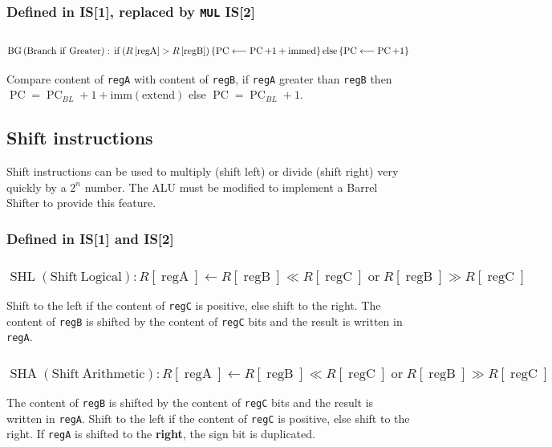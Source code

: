 \documentclass[10pt,a4paper]{article}
\theoremstyle{definition}%
\newcommand{\on}[1]{\operatorname{#1}}
\newcommand{\reg}[1]{\texttt{reg#1}}
\begin{document}
\subsubsection*{ Defined in IS[1], replaced by \texttt{MUL} IS[2]}

\subsubsection{$\on{BG} \on{(Branch~if~Greater)}:\newline \on{if} \left( R\left[ \on{regA} \right] > R\left[ \on{regB} \right]\right) \left\lbrace\on{PC} \longleftarrow \on{PC}+1+\on{immed} \right\rbrace\on{else} \left\lbrace\on{PC} \longleftarrow \on{PC}+1\right\rbrace $}
Compare content of \reg{A} with content of \reg{B}, if \reg{A} greater than \reg{B} then\\$\on{PC}=\on{PC}_{BL}+1+\on{imm(extend)}$ else $\on{PC}=\on{PC}_{BL}+1$.

\subsection{Shift instructions}

Shift instructions can be used to multiply (shift left) or divide (shift right) very quickly by a $2^n$ number. The ALU must be modified to implement a Barrel Shifter to provide this feature.
\subsubsection*{ Defined in IS[1] and IS[2]}
\subsubsection{$\on{SHL} \on{(Shift~ Logical)} : R\left[ \on{regA} \right] \longleftarrow    R\left[ \on{regB} \right] \ll R\left[ \on{regC} \right] \on{or}  R\left[ \on{regB} \right] \gg R\left[ \on{regC} \right] $}
Shift to the left if the content of \reg{C} is positive, else shift to the right. The content of \reg{B} is shifted by the content of \reg{C} bits and the result is written in \reg{A}.

\subsubsection{$\on{SHA} \on{(Shift ~Arithmetic)} : R\left[ \on{regA} \right] \longleftarrow    R\left[ \on{regB} \right] \ll R\left[ \on{regC} \right] \on{or}  R\left[ \on{regB} \right] \gg R\left[ \on{regC} \right] $}
The content of \reg{B} is shifted by the content of \reg{C} bits and the result is written in \reg{A}.
Shift to the left if the content of \reg{C} is positive, else shift to the right.
If \reg{A} is shifted to the \textbf{right}, the sign bit is duplicated.
\end{document}
